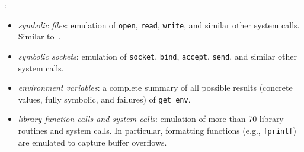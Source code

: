 \cite{AEG-NDSS11}:
\begin{itemize}
  \item {\em symbolic files}: emulation of {\tt open}, {\tt read}, {\tt write}, and similar other system calls. Similar to~\cite{KLEE-OSDI08}.
  \item {\em symbolic sockets}: emulation of {\tt socket}, {\tt bind}, {\tt accept}, {\tt send}, and similar other system calls. 
  \item {\em environment variables}: a complete summary of all possible results (concrete values, fully symbolic, and failures) of {\tt get\_env}.
  \item {\em library function calls and system calls}: emulation of more than 70 library routines and system calls. In particular, formatting functions (e.g., {\tt fprintf}) are emulated to capture buffer overflows.
\end{itemize}

